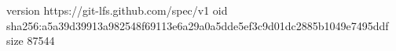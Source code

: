 version https://git-lfs.github.com/spec/v1
oid sha256:a5a39d39913a982548f69113e6a29a0a5dde5ef3c9d01dc2885b1049e7495ddf
size 87544
